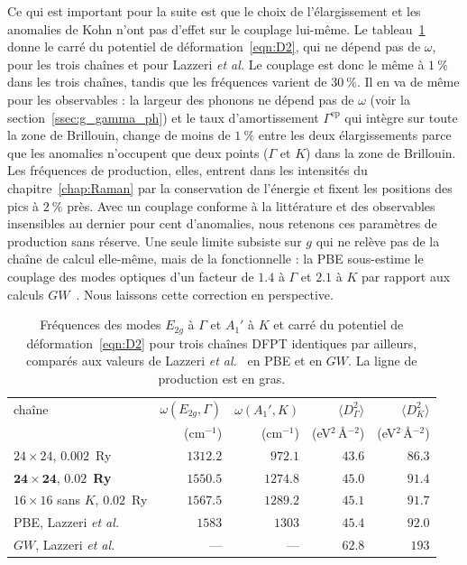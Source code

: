 Ce qui est important pour la suite est que le choix de l'élargissement et les anomalies de Kohn n'ont pas d'effet sur le couplage lui-même. Le tableau~\ref{tab:kohn_chaines} donne le carré du potentiel de déformation~\eqref{eqn:D2}, qui ne dépend pas de $\omega$, pour les trois chaînes et pour Lazzeri \textit{et al.} Le couplage est donc le même à $1~\%$ dans les trois chaînes, tandis que les fréquences varient de $30~\%$. Il en va de même pour les observables : la largeur des phonons ne dépend pas de $\omega$ (voir la section~\ref{ssec:g_gamma_ph}) et le taux d'amortissement $\Gamma^\text{ep}$ qui intègre sur toute la zone de Brillouin, change de moins de $1~\%$ entre les deux élargissements parce que les anomalies n'occupent que deux points ($\Gamma$ et $K$) dans la zone de Brillouin. Les fréquences de production, elles, entrent dans les intensités du chapitre~\ref{chap:Raman} par la conservation de l'énergie et fixent les positions des pics à $2~\%$ près. Avec un couplage conforme à la littérature et des observables insensibles au dernier pour cent d'anomalies, nous retenons ces paramètres de production sans réserve. Une seule limite subsiste sur $g$ qui ne relève pas de la chaîne de calcul elle-même, mais de la fonctionnelle : la PBE sous-estime le couplage des modes optiques d'un facteur de $1.4$ à $\Gamma$ et $2.1$ à $K$ par rapport aux calculs $GW$~\cite{lazzeriImpactElectronelectronCorrelation2008}. Nous laissons cette correction en perspective.
\begin{table}[htbp]
    \centering
    \caption[Fréquences et couplage aux anomalies de Kohn selon la chaîne de calcul.]{Fréquences des modes $E_{2g}$ à $\Gamma$ et $A_1'$ à $K$ et carré du potentiel de déformation~\eqref{eqn:D2} pour trois chaînes DFPT identiques par ailleurs, comparés aux valeurs de Lazzeri \textit{et al.}~\cite{lazzeriImpactElectronelectronCorrelation2008} en PBE et en $GW$. La ligne de production est en gras.}
    \label{tab:kohn_chaines}
    \begin{tabular}{lrrrr}
        \hline\hline
        chaîne & $\omega(E_{2g},\Gamma)$ & $\omega(A_1',K)$ & $\langle D^2_\Gamma\rangle$ & $\langle D^2_K\rangle$ \\
               & (cm$^{-1}$) & (cm$^{-1}$) & (eV$^2$\,\AA$^{-2}$) & (eV$^2$\,\AA$^{-2}$) \\
        \hline
        $24\times 24$, $0.002$~Ry & $1312.2$ & $972.1$ & $43.6$ & $86.3$ \\
        $\mathbf{24\times 24}$, $\mathbf{0.02}$~\textbf{Ry} & $\mathbf{1550.5}$ & $\mathbf{1274.8}$ & $\mathbf{45.0}$ & $\mathbf{91.4}$ \\
        $16\times 16$ sans $K$, $0.02$~Ry & $1567.5$ & $1289.2$ & $45.1$ & $91.7$ \\
        PBE, Lazzeri \textit{et al.} & $1583$ & $1303$ & $45.4$ & $92.0$ \\
        $GW$, Lazzeri \textit{et al.} & --- & --- & $62.8$ & $193$ \\
        \hline\hline
    \end{tabular}
\end{table}

